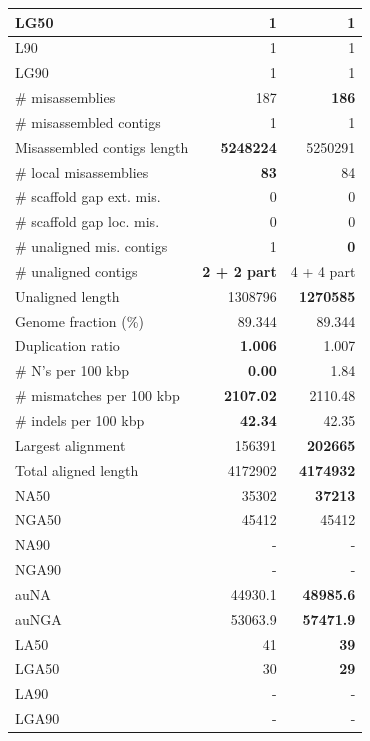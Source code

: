 \documentclass[12pt,a4paper]{article}
\begin{document}
\begin{table}[ht]
\begin{center}
\begin{tabular}{|l*{2}{|r}|}
LG50 & 1 & 1 \\ \hline
L90 & 1 & 1 \\ \hline
LG90 & 1 & 1 \\ \hline
\# misassemblies & 187 & {\bf 186} \\ \hline
\# misassembled contigs & 1 & 1 \\ \hline
Misassembled contigs length & {\bf 5248224} & 5250291 \\ \hline
\# local misassemblies & {\bf 83} & 84 \\ \hline
\# scaffold gap ext. mis. & 0 & 0 \\ \hline
\# scaffold gap loc. mis. & 0 & 0 \\ \hline
\# unaligned mis. contigs & 1 & {\bf 0} \\ \hline
\# unaligned contigs & {\bf 2 + 2 part} & 4 + 4 part \\ \hline
Unaligned length & 1308796 & {\bf 1270585} \\ \hline
Genome fraction (\%) & 89.344 & 89.344 \\ \hline
Duplication ratio & {\bf 1.006} & 1.007 \\ \hline
\# N's per 100 kbp & {\bf 0.00} & 1.84 \\ \hline
\# mismatches per 100 kbp & {\bf 2107.02} & 2110.48 \\ \hline
\# indels per 100 kbp & {\bf 42.34} & 42.35 \\ \hline
Largest alignment & 156391 & {\bf 202665} \\ \hline
Total aligned length & 4172902 & {\bf 4174932} \\ \hline
NA50 & 35302 & {\bf 37213} \\ \hline
NGA50 & 45412 & 45412 \\ \hline
NA90 & - & - \\ \hline
NGA90 & - & - \\ \hline
auNA & 44930.1 & {\bf 48985.6} \\ \hline
auNGA & 53063.9 & {\bf 57471.9} \\ \hline
LA50 & 41 & {\bf 39} \\ \hline
LGA50 & 30 & {\bf 29} \\ \hline
LA90 & - & - \\ \hline
LGA90 & - & - \\ \hline
\end{tabular}
\end{center}
\end{table}
\end{document}
